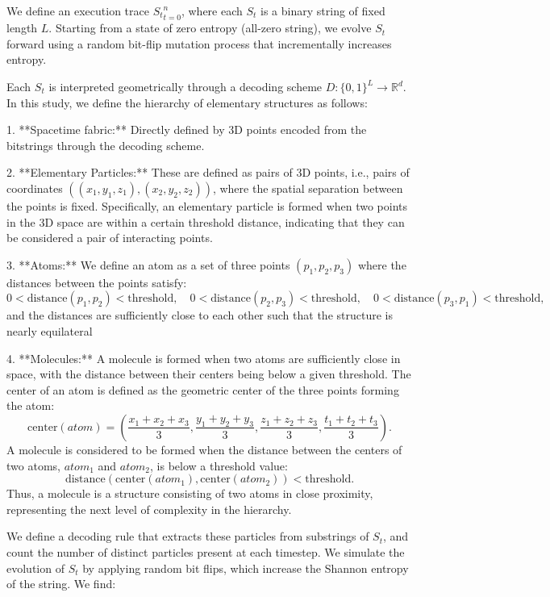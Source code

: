 \documentclass[11pt]{article}
\begin{document}
We define an execution trace ${S_t}_{t=0}^n$, where each $S_t$ is a binary string of fixed length $L$.
Starting from a state of zero entropy (all-zero string), we evolve $S_t$ forward using a random bit-flip mutation process that
incrementally increases entropy.

Each $S_t$ is interpreted geometrically through a decoding scheme $D: \{0,1\}^L \to \mathbb{R}^d$. In this study,
we define the hierarchy of elementary structures as follows:

1. **Spacetime fabric:** Directly defined by 3D points encoded from the bitstrings through the decoding scheme.

2. **Elementary Particles:** These are defined as pairs of 3D points, i.e., pairs of
coordinates $((x_1, y_1, z_1), (x_2, y_2, z_2))$, where the spatial separation between the
points is fixed. Specifically, an elementary particle is formed when two points in the 3D space are within
a certain threshold distance, indicating that they can be considered a pair of interacting points.

3. **Atoms:** We define an atom as a set of three points $(p_1, p_2, p_3)$ where the distances between the points satisfy:
\[
   0 < \text{distance}(p_1, p_2) < \text{threshold}, \quad 0 < \text{distance}(p_2, p_3) < \text{threshold}, \quad 0 < \text{distance}(p_3, p_1) < \text{threshold},
\]
and the distances are sufficiently close to each other such that the structure is nearly equilateral

4. **Molecules:** A molecule is formed when two atoms are sufficiently close in space, with the distance between
their centers being below a given threshold. The center of an atom is defined as the geometric center of the three points forming the atom:
\[
   \text{center}(atom) = \left( \frac{x_1 + x_2 + x_3}{3}, \frac{y_1 + y_2 + y_3}{3}, \frac{z_1 + z_2 + z_3}{3}, \frac{t_1 + t_2 + t_3}{3} \right).
\]
A molecule is considered to be formed when the distance between the centers of two atoms, $atom_1$ and $atom_2$, is below a threshold value:
\[
   \text{distance}(\text{center}(atom_1), \text{center}(atom_2)) < \text{threshold}.
\]
Thus, a molecule is a structure consisting of two atoms in close proximity, representing the next level of complexity in the hierarchy.


We define a decoding rule that extracts these particles from substrings of $S_t$, and count the number of distinct particles
present at each timestep. We simulate the evolution of $S_t$ by applying random bit flips, which increase the Shannon entropy of the string.
We find:
\end{document}
